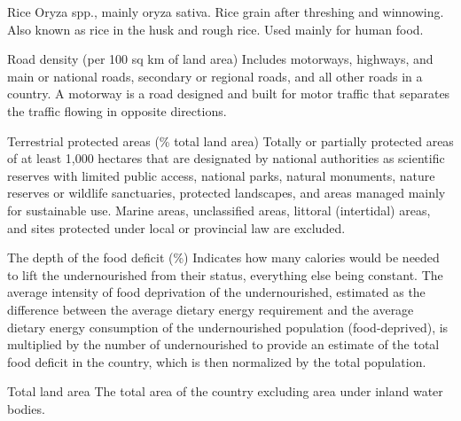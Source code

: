 \begin{MetadataCollection} {}
\begin{metadata}{Rice} {}
Oryza spp., mainly oryza sativa.  Rice grain after threshing and winnowing. Also known as rice in the husk and rough rice. Used mainly for human food.
\end{metadata}

\begin{metadata}{Road density (per 100 sq km of land area)} {}
Includes motorways, highways, and main or national roads, secondary or regional roads, and all other roads in a country. A motorway is a road designed and built for motor traffic that separates the traffic flowing in opposite directions.
\end{metadata}

\begin{metadata}{Terrestrial protected areas (\% total land area)} {}
Totally or partially protected areas of at least 1,000 hectares that are designated by national authorities as scientific reserves with limited public access, national parks, natural monuments, nature reserves or wildlife sanctuaries, protected landscapes, and areas managed mainly for sustainable use. Marine areas, unclassified areas, littoral (intertidal) areas, and sites protected under local or provincial law are excluded.
\end{metadata}

\begin{metadata}{The depth of the food deficit (\%)} {}
Indicates how many calories would be needed to lift the undernourished from their status, everything else being constant. The average intensity of food deprivation of the undernourished, estimated as the difference between the average dietary energy requirement and the average dietary energy consumption of the undernourished population (food-deprived), is multiplied by the number of undernourished to provide an estimate of the total food deficit in the country, which is then normalized by the total population.
\end{metadata}

\begin{metadata}{Total land area} {}
The total area of the country excluding area under inland water bodies.
\end{metadata}


\end{MetadataCollection}
